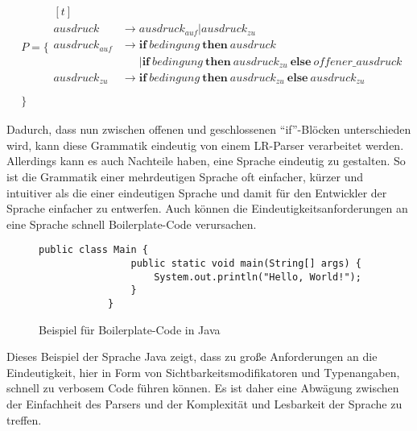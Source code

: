 \documentclass[runningheads]{llncs}
\begin{document}
    \begin{align*}
        & P = \{ \begin{aligned}[t]
                     \\
                     ausdruck & \rightarrow ausdruck_{auf} | ausdruck_{zu} \\
                     ausdruck_{auf} & \rightarrow \textbf{if} \ bedingung \ \textbf{then} \ ausdruck \\
                     \phantom{A} & \phantom{\rightarrow} \vert \textbf{if} \ bedingung \ \textbf{then} \ ausdruck_{zu} \ \textbf{else} \ offener\_ausdruck \\
                     ausdruck_{zu} & \rightarrow \textbf{if} \ bedingung \ \textbf{then} \ ausdruck_{zu} \ \textbf{else} \ ausdruck_{zu} \\
        \end{aligned} \\
        & \}
    \end{align*}

    Dadurch, dass nun zwischen offenen und geschlossenen ``if''-Blöcken unterschieden wird,
    kann diese Grammatik eindeutig von einem LR-Parser verarbeitet werden.
    Allerdings kann es auch Nachteile haben, eine Sprache eindeutig zu gestalten.
    So ist die Grammatik einer mehrdeutigen Sprache oft einfacher, kürzer und intuitiver als die einer eindeutigen Sprache
    und damit für den Entwickler der Sprache einfacher zu entwerfen.
    Auch können die Eindeutigkeitsanforderungen an eine Sprache schnell Boilerplate-Code verursachen.

    \begin{figure}
        \begin{lstlisting}[style=lstStyle,label={lst:lstlisting3}]
			public class Main {
			    public static void main(String[] args) {
			        System.out.println("Hello, World!");
			    }
			}
        \end{lstlisting}
        \caption{Beispiel für Boilerplate-Code in Java}
        \label{fig:figure4}
    \end{figure}

    Dieses Beispiel der Sprache Java zeigt, dass zu große Anforderungen an die Eindeutigkeit,
    hier in Form von Sichtbarkeitsmodifikatoren und Typenangaben, schnell zu verbosem Code führen können.
    Es ist daher eine Abwägung zwischen der Einfachheit des Parsers und der Komplexität und Lesbarkeit der Sprache zu treffen.

    \newpage
\end{document}
